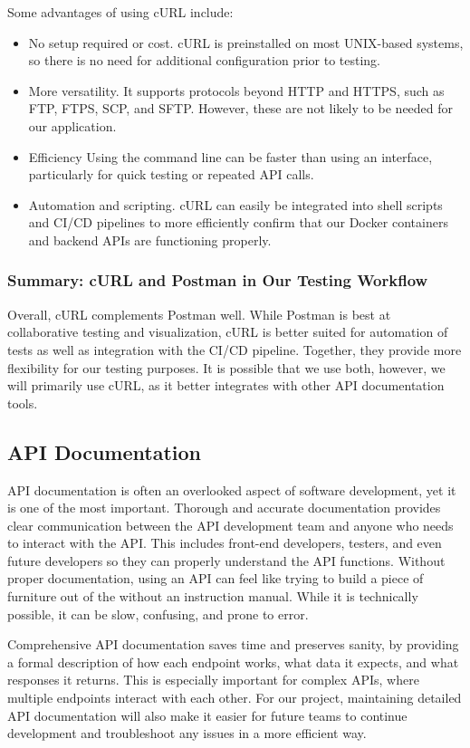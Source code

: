 \documentclass[12pt]{article}
\begin{document}
Some advantages of using cURL include:
\begin{itemize}
    \item No setup required or cost. cURL is preinstalled on most UNIX-based systems, so there is no need for additional configuration prior to testing.
    \item More versatility. It supports protocols beyond HTTP and HTTPS, such as FTP, FTPS, SCP, and SFTP. However, these are not likely to be needed for our application.
    \item Efficiency Using the command line can be faster than using an interface, particularly for quick testing or repeated API calls.
    \item Automation and scripting. cURL can easily be integrated into shell scripts and CI/CD pipelines to more efficiently confirm that our Docker containers and backend APIs are functioning properly.
\end{itemize}

\subsubsection{Summary: cURL and Postman in Our Testing Workflow}
Overall, cURL complements Postman well. While Postman is best at collaborative testing and visualization, cURL is better suited for automation of tests as well as integration with the CI/CD pipeline. Together, they provide more flexibility for our testing purposes. It is possible that we use both, however, we will primarily use cURL, as it better integrates with other API documentation tools.

\subsection{API Documentation}
API documentation is often an overlooked aspect of software development, yet it is one of the most important. Thorough and accurate documentation provides clear communication between the API development team and anyone who needs to interact with the API. This includes front-end developers, testers, and even future developers so they can properly understand the API functions. Without proper documentation, using an API can feel like trying to build a piece of furniture out of the without an instruction manual. While it is technically possible, it can be slow, confusing, and prone to error.

Comprehensive API documentation saves time and preserves sanity, by providing a formal description of how each endpoint works, what data it expects, and what responses it returns. This is especially important for complex APIs, where multiple endpoints interact with each other. For our project, maintaining detailed API documentation will also make it easier for future teams to continue development and troubleshoot any issues in a more efficient way.
\end{document}
